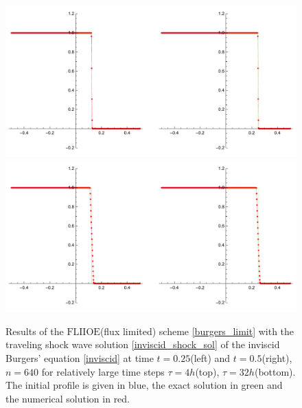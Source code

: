 \documentclass[../include.tex]{subfiles}
\begin{document}
\begin{figure}[H]
	\centering
	\includegraphics[width=.8\textwidth]{figures/inviscidShock640c4}
	\includegraphics[width=.8\textwidth]{figures/inviscidShock640c32}
	\caption{Results of the $\mathrm{FLIIOE}$(flux limited) scheme \eqref{burgers_limit} with the traveling shock wave solution \eqref{inviscid_shock_sol} of the inviscid Burgers' equation \eqref{inviscid} at time $ t=0.25 $(left) and $ t=0.5 $(right), $ n=640 $ for relatively large time steps $ \tau=4h $(top), $ \tau=32h $(bottom). The initial profile is given in blue, the exact solution in green and the numerical solution in red.}
	\label{fig:fliioe_burg_shock}
\end{figure}
\end{document}

